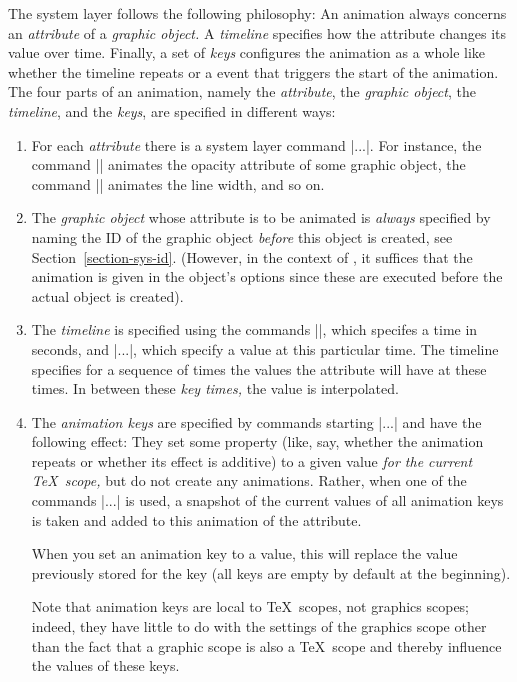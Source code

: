 The system layer follows the following philosophy: An animation always
concerns an \emph{attribute} of a \emph{graphic object.} A
\emph{timeline} specifies how the attribute changes its value over
time. Finally, a set of \emph{keys} configures the animation as a
whole like whether the timeline repeats or a event that triggers the
start of the animation. The four parts of an animation, namely the
\emph{attribute}, the \emph{graphic object}, the \emph{timeline}, and
the \emph{keys}, are specified in different ways: 

\begin{enumerate}
\item For each \emph{attribute} there is a system layer command
  |\pgfsys@animate...|. For instance, the command |\pgfsys@animateopacity|
  animates the opacity attribute of some graphic object, the command
  |\pgfsys@animatelinewidth| animates the line width, and so on.
\item The \emph{graphic object} whose attribute is to be animated is
  \emph{always} specified by naming the ID of the graphic object
  \emph{before} this object is created, see
  Section~\ref{section-sys-id}. (However, in the context of
  \tikzname, it suffices that the animation is given in the object's
  options since these are executed before the actual object is
  created).
\item The \emph{timeline} is specified using the commands
  |\pgfsys@animation@time|, which specifes a time in seconds, and
  |\pgfsys@animation@val...|, which specify a value at this particular
  time. The timeline specifies for a sequence of times the values the
  attribute will have at these times. In between these \emph{key
    times,} the value is interpolated.
\item The \emph{animation keys} are specified by commands starting
  |\pgfsys@animation@...| and have the following effect: They set some
  property (like, say, whether the animation repeats or whether its
  effect is additive) to a given value \emph{for the current \TeX\
    scope,} but do not create any animations. Rather, when one of the
  commands |\pgfsys@animate...| is used, a snapshot of the current
  values of all animation keys is taken and added to this animation of
  the attribute.

  When you set an animation key to a value, this will replace
  the value previously stored for the key (all keys are empty by
  default at the beginning).

  Note that animation keys are local to \TeX\ scopes, not graphics
  scopes; indeed, they have little to do with the settings of the
  graphics scope other than the fact that a graphic scope is also a
  \TeX\ scope and thereby influence the values of these keys.
\end{enumerate}

